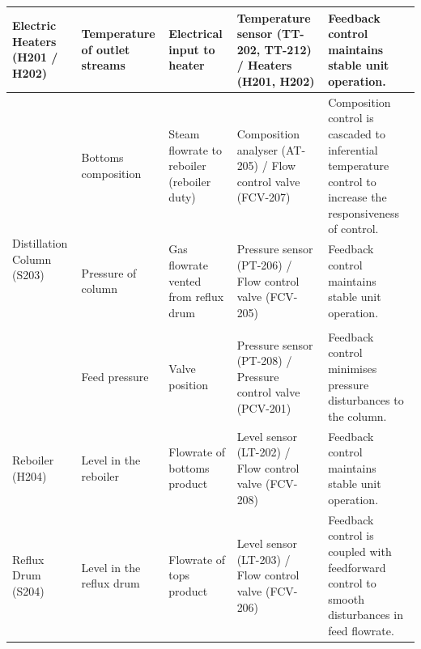 \begin{table}[h]
{\begin{tabular}{p{3cm}|p{3cm}|p{4cm}|p{5cm}|p{6cm}}
Electric Heaters (H201 / H202)              & Temperature of outlet streams               & Electrical input to heater                              & Temperature sensor (TT-202, TT-212) / Heaters (H201, H202)                 & Feedback control maintains stable unit operation.                                                                                    \\ \midrule
\multirow{4}{*}{Distillation Column (S203)} & Bottoms composition                         & Steam flowrate to reboiler (reboiler duty)              & Composition analyser (AT-205) / Flow control valve (FCV-207)               & Composition control is cascaded to inferential temperature control to   increase the responsiveness of control.                      \\
                                            & Pressure of column        & Gas   flowrate vented from reflux drum & Pressure   sensor (PT-206) / Flow control valve (FCV-205) & Feedback   control maintains stable unit operation.                                                                \\
                                            &                                             &                                                         &                                                                            &                                                                                                                                      \\
                                            & Feed   pressure                             & Valve position                                          & Pressure sensor (PT-208) / Pressure control valve (PCV-201)                & Feedback control minimises pressure disturbances to the column.                                                                      \\ \midrule
Reboiler (H204)                             & Level in the reboiler                       & Flowrate of bottoms product                             & Level sensor (LT-202) / Flow control valve (FCV-208)                       & Feedback control maintains stable unit operation.                                                                                    \\ \midrule
Reflux Drum (S204)        & Level in   the reflux drum & Flowrate   of tops product            & Level   sensor (LT-203) / Flow control valve (FCV-206)   & Feedback   control is coupled with feedforward control to smooth disturbances in feed flowrate.                   \\

\end{tabular}}
\end{table}

